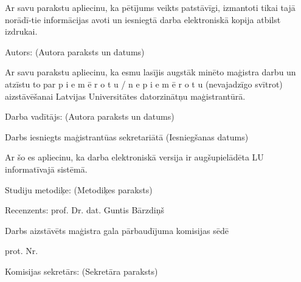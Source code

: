 \documentclass[12pt, a4paper]{article}
\numberwithin{equation}{section} %
\begin{document}
Ar savu parakstu apliecinu, ka pētījums veikts patstāvīgi, izmantoti tikai tajā norādī-tie informācijas avoti un iesniegtā darba elektroniskā kopija atbilst izdrukai. \bigbreak

Autors: \underline{\hspace{7cm}} (Autora paraksts un datums) \bigbreak

Ar savu parakstu apliecinu, ka esmu lasījis augstāk minēto maģistra darbu un atzīstu
to par p i e m ē r o t u / n e p i e m ē r o t u (nevajadzīgo svītrot) aizstāvēšanai Latvijas Universitātes datorzinātņu maģistrantūrā. \bigbreak

Darba vadītājs: \underline{\hspace{5cm}} (Autora paraksts un datums) \bigbreak

Darbs iesniegts maģistrantūas sekretariātā  \underline{\hspace{3cm}} (Iesniegšanas datums) \bigbreak

Ar šo es apliecinu, ka darba elektroniskā versija ir augšupielādēta LU informatīvajā sistēmā.

Studiju metodiķe: \underline{\hspace{5cm}} (Metodiķes paraksts) \bigbreak

Recenzents: prof. Dr. dat. Guntis Bārzdiņš \bigbreak

Darbs aizstāvēts maģistra gala pārbaudījuma komisijas sēdē \bigbreak

\underline{\hspace{5cm}} prot. Nr. \underline{\hspace{3cm}} \bigbreak

Komisijas sekretārs: \underline{\hspace{5cm}} (Sekretāra paraksts)
\end{document}
